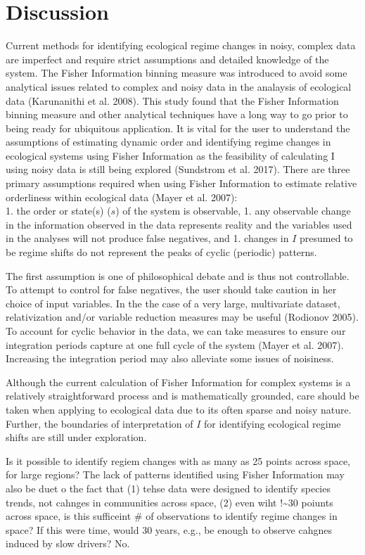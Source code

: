 \documentclass[12pt,twoside,openany]{reedthesis}
\begin{document}
\section{Discussion}\label{discussion-1}

Current methods for identifying ecological regime changes in noisy,
complex data are imperfect and require strict assumptions and detailed
knowledge of the system. The Fisher Information binning measure was
introduced to avoid some analytical issues related to complex and noisy
data in the analaysis of ecological data (Karunanithi et al. 2008). This
study found that the Fisher Information binning measure and other
analytical techniques have a long way to go prior to being ready for
ubiquitous application. It is vital for the user to understand the
assumptions of estimating dynamic order and identifying regime changes
in ecological systems using Fisher Information as the feasibility of
calculating I using noisy data is still being explored (Sundstrom et al.
2017). There are three primary assumptions required when using Fisher
Information to estimate relative orderliness within ecological data
(Mayer et al. 2007):\\
1. the order or state(s) (\(s\)) of the system is observable, 1. any
observable change in the information observed in the data represents
reality and the variables used in the analyses will not produce false
negatives, and 1. changes in \(I\) presumed to be regime shifts do not
represent the peaks of cyclic (periodic) patterns.

The first assumption is one of philosophical debate and is thus not
controllable. To attempt to control for false negatives, the user should
take caution in her choice of input variables. In the the case of a very
large, multivariate dataset, relativization and/or variable reduction
measures may be useful (Rodionov 2005). To account for cyclic behavior
in the data, we can take measures to ensure our integration periods
capture at one full cycle of the system (Mayer et al. 2007). Increasing
the integration period may also alleviate some issues of noisiness.

Although the current calculation of Fisher Information for complex
systems is a relatively straightforward process and is mathematically
grounded, care should be taken when applying to ecological data due to
its often sparse and noisy nature. Further, the boundaries of
interpretation of \(I\) for identifying ecological regime shifts are
still under exploration.

Is it possible to identify regiem changes with as many as 25 points
across space, for large regions? The lack of patterns identified using
Fisher Information may also be duet o the fact that (1) tehse data were
designed to identify species trends, not cahnges in communities across
space, (2) even wiht !\textasciitilde{}30 poiunts across space, is this
sufficeint \# of observations to identify regime changes in space? If
this were time, would 30 years, e.g., be enough to observe cahgnes
induced by slow drivers? No.
\end{document}
